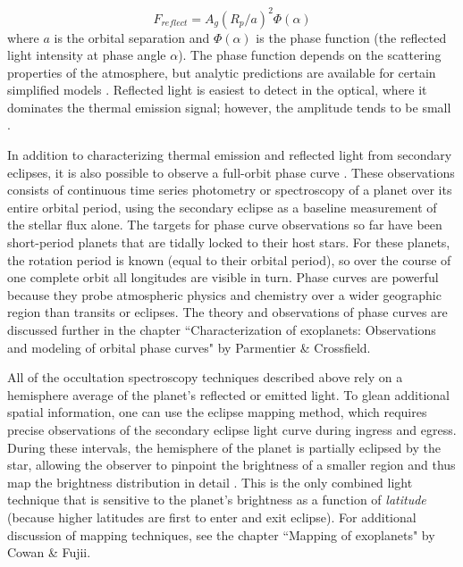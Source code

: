 \documentclass[graybox,natbib,nosecnum]{svmult}
\begin{document}
\begin{equation}
F_{reflect} = A_g(R_p/a)^2 \Phi(\alpha)
\end{equation}
where $a$ is the orbital separation and $\Phi(\alpha)$ is the phase function (the reflected light intensity at phase angle $\alpha$). The phase function depends on the scattering properties of the atmosphere, but analytic predictions are available for certain simplified models \citep[e.g.][]{madhu12}.  Reflected light is easiest to detect in the optical, where it dominates the thermal emission signal; however, the amplitude tends to be small \citep[typically less than 100 ppm;][]{angerhausen15}.

In addition to characterizing thermal emission and reflected light from secondary eclipses, it is also possible to observe a full-orbit phase curve \citep{seager00b, knutson07}. These observations consists of continuous time series photometry or spectroscopy of a planet over its entire orbital period, using the secondary eclipse as a baseline measurement of the stellar flux alone.  The targets for phase curve observations so far have been short-period planets that are tidally locked to their host stars. For these planets, the rotation period is known (equal to their orbital period), so over the course of one complete orbit all longitudes are visible in turn.  Phase curves are powerful because they probe atmospheric physics and chemistry over a wider geographic region than transits or eclipses. The theory and observations of phase curves are discussed further in the chapter ``Characterization of exoplanets: Observations and modeling of orbital phase curves" by Parmentier \& Crossfield. 


All of the occultation spectroscopy techniques described above rely on a hemisphere average of the planet's reflected or emitted light. To glean additional spatial information, one can use the eclipse mapping method, which requires precise observations of the secondary eclipse light curve during ingress and egress.  During these intervals, the hemisphere of the planet is partially eclipsed by the star, allowing the observer to pinpoint the brightness of a smaller region and thus map the brightness distribution in detail \citep{rauscher07, dewit12}.  This is the only combined light technique that is sensitive to the planet's brightness as a function of \emph{latitude} (because higher latitudes are first to enter and exit eclipse). For additional discussion of mapping techniques, see the chapter ``Mapping of exoplanets" by Cowan \& Fujii.
\end{document}

